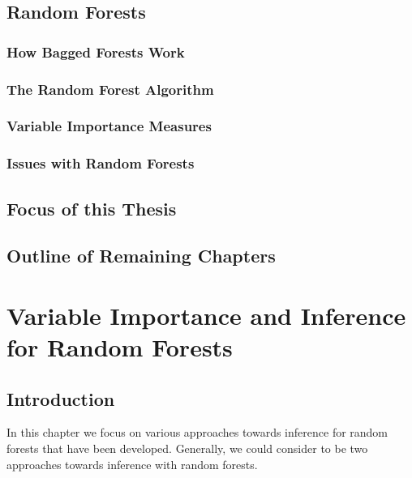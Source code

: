 \documentclass[12pt,twoside]{reedthesis}
\theoremstyle{definition}
\theoremstyle{definition}
\theoremstyle{definition}
\theoremstyle{remark}
\begin{document}
\section{Random Forests}\label{random-forests}

\subsection{How Bagged Forests Work}\label{how-bagged-forests-work}

\subsection{The Random Forest
Algorithm}\label{the-random-forest-algorithm}

\subsection{Variable Importance
Measures}\label{variable-importance-measures}

\subsection{Issues with Random
Forests}\label{issues-with-random-forests}

\section{Focus of this Thesis}\label{focus-of-this-thesis}

\section{Outline of Remaining
Chapters}\label{outline-of-remaining-chapters}

\chapter{Variable Importance and Inference for Random
Forests}\label{variable-importance-and-inference-for-random-forests}

\section{Introduction}\label{introduction}

In this chapter we focus on various approaches towards inference for
random forests that have been developed. Generally, we could consider to
be two approaches towards inference with random forests.
\end{document}
